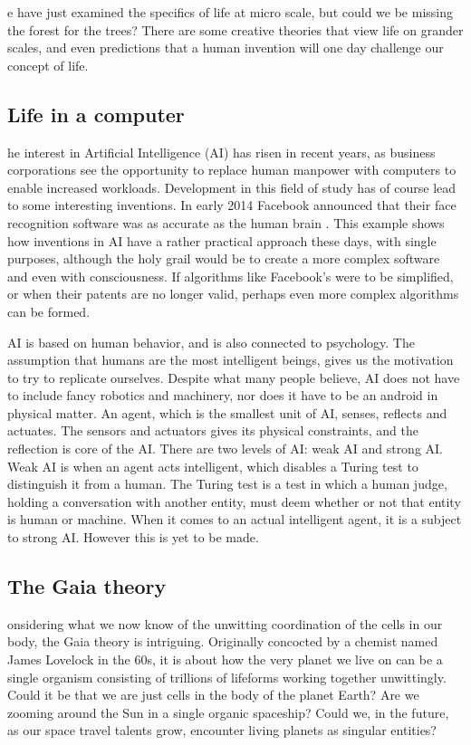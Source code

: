 e have just examined the specifics of life at micro scale, but could we be missing the forest for the trees?
There are some creative theories that view life on grander scales, and even predictions that a human invention will one day challenge our concept of life.

\subsection{Life in a computer}
he interest in Artificial Intelligence (AI) has risen in recent years, as business corporations see the opportunity to replace human manpower with computers to enable increased workloads.
Development in this field of study has of course lead to some interesting inventions.
In early 2014 Facebook announced that their face recognition software was as accurate as the human brain \cite{facebook}.
This example shows how inventions in AI have a rather practical approach these days, with single purposes, although the holy grail would be to create a more complex software and even with consciousness.
If algorithms like Facebook's were to be simplified, or when their patents are no longer valid, perhaps even more complex algorithms can be formed.

AI is based on human behavior, and is also connected to psychology.
The assumption that humans are the most intelligent beings, gives us the motivation to try to replicate ourselves.
Despite what many people believe, AI does not have to include fancy robotics and machinery, nor does it have to be an android in physical matter.
An agent, which is the smallest unit of AI, senses, reflects and actuates.
The sensors and actuators gives its physical constraints, and the reflection is core of the AI.
There are two levels of AI: weak AI and strong AI.
Weak AI is when an agent acts intelligent, which disables a Turing test to distinguish it from a human.
The Turing test is a test in which a human judge, holding a conversation with another entity, must deem whether or not that entity is human or machine. 
When it comes to an actual intelligent agent, it is a subject to strong AI.
However this is yet to be made.



\subsection{The Gaia theory}
onsidering what we now know of the unwitting coordination of the cells in our body, the Gaia theory is intriguing.
Originally concocted by a chemist named James Lovelock\cite{Lovelock} in the 60s, it is about how the very planet we live on can be a single organism consisting of trillions of lifeforms working together unwittingly.
Could it be that we are just cells in the body of the planet Earth?
Are we zooming around the Sun in a single organic spaceship?
Could we, in the future, as our space travel talents grow, encounter living planets as singular entities?